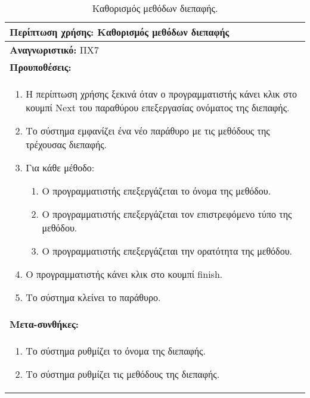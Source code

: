 \begin{table}[H]
	\hspace*{-0.2cm}
    \centering
    \scriptsize
	\begin{tabular}{|p{10cm}|}
	\hline
		\textbf{Περίπτωση χρήσης:} Καθορισμός μεθόδων διεπαφής \\
	\hline
		\textbf{Αναγνωριστικό:} ΠΧ7 \\
	\hline	
		\textbf{Προυποθέσεις:} \\
		\begin{enumerate}
			\item Η περίπτωση χρήσης ξεκινά όταν ο προγραμματιστής κάνει κλικ στο κουμπί Next του παραθύρου επεξεργασίας ονόματος της διεπαφής.
			\item Το σύστημα εμφανίζει ένα νέο παράθυρο με τις μεθόδους της τρέχουσας διεπαφής.
			\item Για κάθε μέθοδο:\begin{enumerate}
									 \item Ο προγραμματιστής επεξεργάζεται το όνομα της μεθόδου.
									\item Ο προγραμματιστής επεξεργάζεται τον επιστρεφόμενο τύπο της μεθόδου.
									  \item Ο προγραμματιστής επεξεργάζεται την ορατότητα της μεθόδου.
								   \end{enumerate}
			 \item Ο προγραμματιστής κάνει κλικ στο κουμπί finish.
			 \item Το σύστημα κλείνει το παράθυρο.
		   \end{enumerate} \\
	   \hline
		   \textbf{Μετα-συνθήκες:} \\
		   \begin{enumerate}
			   \item Το σύστημα ρυθμίζει το όνομα της διεπαφής.
			   \item Το σύστημα ρυθμίζει τις μεθόδους της διεπαφής.
		   \end{enumerate} \\
	\hline
    \end{tabular}
    \caption{Καθορισμός μεθόδων διεπαφής.}
    \label{tab:setInterfaceMethodsUC}
\end{table}
